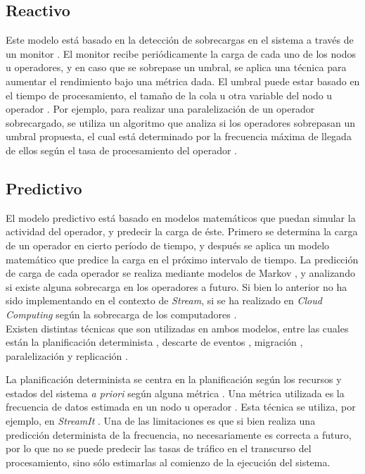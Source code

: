 \subsection{Reactivo}

Este modelo está basado en la detección de sobrecargas en el sistema a través de un monitor \cite{GulisanoJPSV12}. El monitor recibe periódicamente la carga de cada uno de los nodos u operadores, y en caso que se sobrepase un umbral, se aplica una técnica para aumentar el rendimiento bajo una métrica dada. El umbral puede estar basado en el tiempo de procesamiento, el tamaño de la cola u otra variable del nodo u operador \cite{BhuvanagiriGKS06}. Por ejemplo, para realizar una paralelización de un operador sobrecargado, se utiliza un algoritmo que analiza si los operadores sobrepasan un umbral propuesta, el cual está determinado por la frecuencia máxima de llegada de ellos según el tasa de procesamiento del operador \cite{SchneiderAGBW09}.

\subsection{Predictivo}
El modelo predictivo está basado en modelos matemáticos que puedan simular la actividad del operador, y predecir la carga de éste. Primero se determina la carga de un operador en cierto período de tiempo, y después se aplica un modelo matemático que predice la carga en el próximo intervalo de tiempo. La predicción de carga de cada operador se realiza mediante modelos de Markov \cite{GongGW10}, y analizando si existe alguna sobrecarga en los operadores a futuro. Si bien lo anterior no ha sido implementando en el contexto de \textsl{Stream}, si se ha realizado en \textsl{Cloud Computing} según la sobrecarga de los computadores \cite{NguyenSGSW13}.\\

Existen distintas técnicas que son utilizadas en ambos modelos, entre las cuales están la planificación determinista \cite{XuCTS14, DongTS07}, descarte de eventos \cite{SheuC09}, migración \cite{XingZH05}, para\-lelización \cite{GulisanoJPSV12, IshiiS11, GedikSHW14} y replicación \cite{FernandezMKP13}.

La planificación determinista \cite{DongTS07} se centra en la planificación según los recursos y estados del sistema \textsl{a priori} según alguna métrica \cite{XuCTS14}. Una métrica utilizada es la frecuencia de datos estimada en un nodo u operador \cite{Ganguly09}. Esta técnica se utiliza, por ejemplo, en \textsl{StreamIt} \cite{ThiesKA02}. Una de las limitaciones es que si bien realiza una predicción determinista de la frecuencia, no necesariamente es correcta a futuro, por lo que no se puede predecir las tasas de tráfico en el transcurso del procesamiento, sino sólo estimarlas al comienzo de la ejecución del sistema.

